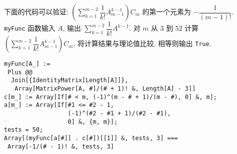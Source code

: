 \documentclass[color=black,device=normal,lang=cn,mode=geye]{elegantnote}
\begin{document}
\begin{note}
    下面的代码可以验证: $\left(\sum\limits_{k=1}^{m-2}\dfrac{1}{k!}A_{m-1}^{k-1}\right)C_m$ 的第一个元素为 $-\dfrac{1}{(m-1)!}$. \verb|myFunc| 函数输入 $A$, 输出 $\sum\limits_{k=1}^{m-2}\dfrac{1}{k!}A^{k-1}$. 对 $m$ 从 $3$ 到 $52$ 计算 $\left(\sum\limits_{k=1}^{m-2}\dfrac{1}{k!}A_{m-1}^{k-1}\right)C_m$, 将计算结果与理论值比较, 相等则输出 \verb|True|.
    \vspace{.5cm}
    \begin{lstlisting}
myFunc[A_] := 
 Plus @@ 
  Join[{IdentityMatrix[Length[A]]}, 
   Array[MatrixPower[A, #]/(# + 1)! &, Length[A] - 3]]
c[m_] := Array[If[# < m, (-1)^(m - # + 1)/(m - #), 0] &, m];
a[m_] := Array[If[#1 <= #2 - 1,
                  (-1)^(#2 - #1 + 1)/(#2 - #1),
                  0] &, {m, m}];
tests = 50;
Array[(myFunc[a[#]] . c[#])[[1]] &, tests, 3] === 
 Array[-1/(# - 1)! &, tests, 3]
    \end{lstlisting}
\end{note}
\end{document}
